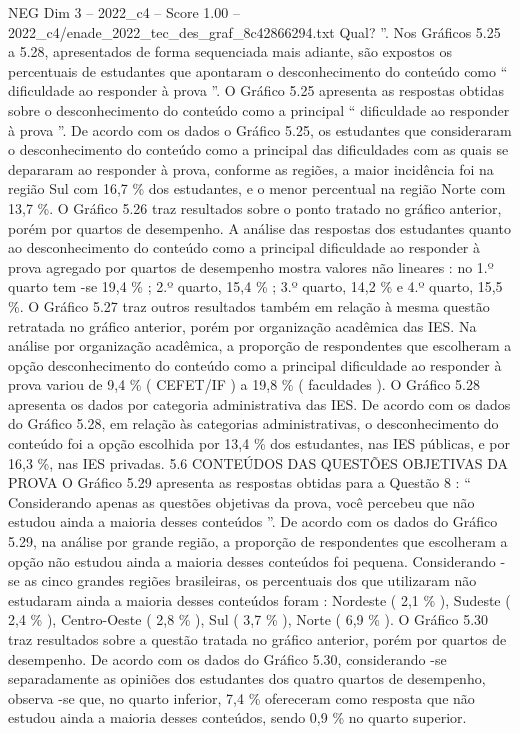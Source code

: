 \begin{textsample}{NEG Dim 3 – 2022\_c4 – Score 1.00 – 2022\_c4/enade\_2022\_tec\_des\_graf\_8c42866294.txt}
Qual? ”.
Nos Gráficos 5.25 a 5.28, apresentados de forma sequenciada mais adiante, são expostos os percentuais de estudantes que apontaram o desconhecimento do conteúdo como “ dificuldade ao responder à prova ”.
O Gráfico 5.25 apresenta as respostas obtidas sobre o desconhecimento do conteúdo como a principal “ dificuldade ao responder à prova ”.
De acordo com os dados o Gráfico 5.25, os estudantes que consideraram o desconhecimento do conteúdo como a principal das dificuldades com as quais se depararam ao responder à prova, conforme as regiões, a maior incidência foi na região Sul com 16,7 \% dos estudantes, e o menor percentual na região Norte com 13,7 \%.
O Gráfico 5.26 traz resultados sobre o ponto tratado no gráfico anterior, porém por quartos de desempenho.
A análise das respostas dos estudantes quanto ao desconhecimento do conteúdo como a principal dificuldade ao responder à prova agregado por quartos de desempenho mostra valores não lineares : no 1.º quarto tem -se 19,4 \% ; 2.º quarto, 15,4 \% ; 3.º quarto, 14,2 \% e 4.º quarto, 15,5 \%.
O Gráfico 5.27 traz outros resultados também em relação à mesma questão retratada no gráfico anterior, porém por organização acadêmica das IES.
Na análise por organização acadêmica, a proporção de respondentes que escolheram a opção desconhecimento do conteúdo como a principal dificuldade ao responder à prova variou de 9,4 \% ( CEFET/IF ) a 19,8 \% ( faculdades ).
O Gráfico 5.28 apresenta os dados por categoria administrativa das IES.
De acordo com os dados do Gráfico 5.28, em relação às categorias administrativas, o desconhecimento do conteúdo foi a opção escolhida por 13,4 \% dos estudantes, nas IES públicas, e por 16,3 \%, nas IES privadas. 5.6 CONTEÚDOS DAS QUESTÕES OBJETIVAS DA PROVA O Gráfico 5.29 apresenta as respostas obtidas para a Questão 8 : “ Considerando apenas as questões objetivas da prova, você percebeu que não estudou ainda a maioria desses conteúdos ”.
De acordo com os dados do Gráfico 5.29, na análise por grande região, a proporção de respondentes que escolheram a opção não estudou ainda a maioria desses conteúdos foi pequena.
Considerando -se as cinco grandes regiões brasileiras, os percentuais dos que utilizaram não estudaram ainda a maioria desses conteúdos foram : Nordeste ( 2,1 \% ), Sudeste ( 2,4 \% ), Centro-Oeste ( 2,8 \% ), Sul ( 3,7 \% ), Norte ( 6,9 \% ).
O Gráfico 5.30 traz resultados sobre a questão tratada no gráfico anterior, porém por quartos de desempenho.
De acordo com os dados do Gráfico 5.30, considerando -se separadamente as opiniões dos estudantes dos quatro quartos de desempenho, observa -se que, no quarto inferior, 7,4 \% ofereceram como resposta que não estudou ainda a maioria desses conteúdos, sendo 0,9 \% no quarto superior.

\end{textsample}
